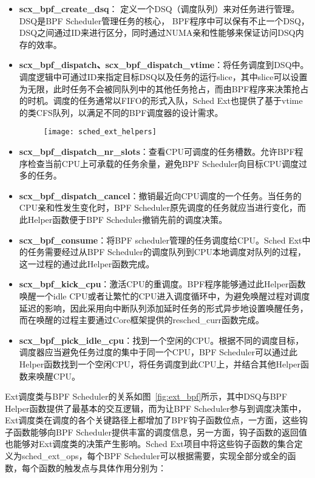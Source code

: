 \begin{itemize}
    \item \textbf{scx\_bpf\_create\_dsq}： 定义一个DSQ（调度队列）来对任务进行管理。DSQ是BPF Scheduler管理任务的核心， BPF程序中可以保有不止一个DSQ，DSQ之间通过ID来进行区分，同时通过NUMA亲和性能够来保证访问DSQ内存的效率。
    \item \textbf{scx\_bpf\_dispatch、scx\_bpf\_dispatch\_vtime}：将任务调度到DSQ中。调度逻辑中可通过ID来指定目标DSQ以及任务的运行slice，其中slice可以设置为无限，此时任务不会被同队列中的其他任务抢占，而由BPF程序来决策抢占的时机。调度的任务通常以FIFO的形式入队，Sched Ext也提供了基于vtime的类CFS队列，以满足不同的BPF调度器的设计需求。

    \begin{figure}[!htbp]
        \centering
        \texttt{[image: sched\_ext\_helpers]}
        \label{fig:sched_ext_helpers}
    \end{figure}

    
    \item \textbf{scx\_bpf\_dispatch\_nr\_slots}：查看CPU可调度的任务槽数。允许BPF程序检查当前CPU上可承载的任务余量，避免BPF Scheduler向目标CPU调度过多的任务。
    \item \textbf{scx\_bpf\_dispatch\_cancel}：撤销最近向CPU调度的一个任务。当任务的CPU亲和性发生变化时，BPF Scheduler原先调度的任务就应当进行变化，而此Helper函数便于BPF Scheduler撤销先前的调度决策。
    \item \textbf{scx\_bpf\_consume}：将BPF scheduler管理的任务调度给CPU。Sched Ext中的任务需要经过从BPF Scheduler的调度队列到CPU本地调度对队列的过程，这一过程的通过此Helper函数完成。
    \item \textbf{scx\_bpf\_kick\_cpu}：激活CPU的重调度。BPF程序能够通过此Helper函数唤醒一个idle CPU或者让繁忙的CPU进入调度循环中，为避免唤醒过程对调度延迟的影响，因此采用向中断队列添加延时任务的形式异步地设置唤醒任务，而在唤醒的过程主要通过Core框架提供的resched\_curr函数完成。
    \item \textbf{scx\_bpf\_pick\_idle\_cpu}：找到一个空闲的CPU。根据不同的调度目标，调度器应当避免任务过度的集中于同一个CPU，BPF Scheduler可以通过此Helper函数找到一个空闲CPU，将任务调度到此CPU上，并结合其他Helper函数来唤醒CPU。
\end{itemize}

Ext调度类与BPF Scheduler的关系如图~\ref{fig:ext_bpf}所示，其中DSQ与BPF Helper函数提供了最基本的交互逻辑，而为让BPF Scheduler参与到调度决策中，Ext调度类在调度的各个关键路径上都增加了BPF钩子函数位点，一方面，这些钩子函数能够向BPF Scheduler提供丰富的调度信息，另一方面，钩子函数的返回值也能够对Ext调度类的决策产生影响。Sched Ext项目中将这些钩子函数的集合定义为sched\_ext\_ops，每个BPF Scheduler可以根据需要，实现全部分或全的函数，每个函数的触发点与具体作用分别为：

